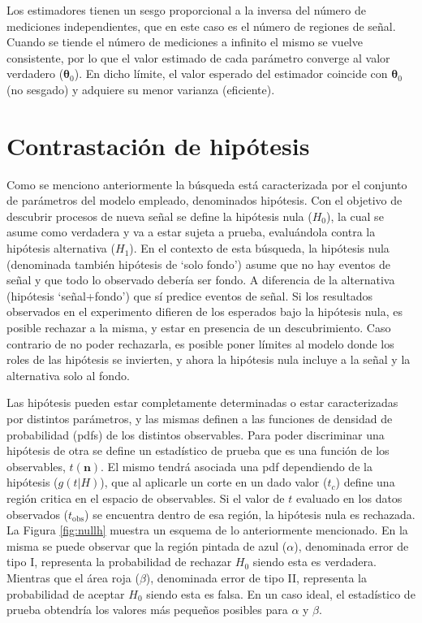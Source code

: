 Los estimadores tienen un sesgo proporcional a la inversa del número de mediciones independientes, que en este caso es el número de regiones de señal. Cuando se tiende el número de mediciones a infinito el mismo se vuelve consistente, por lo que el valor estimado de cada parámetro converge al valor verdadero ($\bm{\theta}_0$). En dicho límite, el valor esperado del estimador coincide con $\bm{\theta}_0$ (no sesgado) y adquiere su menor varianza (eficiente).



\section{Contrastación de hipótesis}

Como se menciono anteriormente la búsqueda está caracterizada por el conjunto de parámetros del modelo empleado, denominados hipótesis. Con el objetivo de descubrir procesos de nueva señal se define la hipótesis nula ($H_0$), la cual se asume como verdadera y va a estar sujeta a prueba, evaluándola contra la hipótesis alternativa ($H_1$). En el contexto de esta búsqueda, la hipótesis nula (denominada también hipótesis de `solo fondo') asume que no hay eventos de señal y que todo lo observado debería ser fondo. A diferencia de la alternativa (hipótesis `señal+fondo') que sí predice eventos de señal. Si los resultados observados en el experimento difieren de los esperados bajo la hipótesis nula, es posible rechazar a la misma, y estar en presencia de un descubrimiento. Caso contrario de no poder rechazarla, es posible poner límites al modelo donde los roles de las hipótesis se invierten, y ahora la hipótesis nula incluye a la señal y la alternativa solo al fondo.

Las hipótesis pueden estar completamente determinadas o estar caracterizadas por distintos parámetros, y las mismas definen a las funciones de densidad de probabilidad (pdfs) de los distintos observables. Para poder discriminar una hipótesis de otra se define un estadístico de prueba que es una función de los observables, $t(\textbf{n})$. El mismo tendrá asociada una pdf dependiendo de la hipótesis ($g(t|H)$), que al aplicarle un corte en un dado valor ($t_c$) define una región critica en el espacio de observables. Si el valor de $t$ evaluado en los datos observados ($t_{\text{obs}}$) se encuentra dentro de esa región, la hipótesis nula es rechazada. La Figura \ref{fig:nullh} muestra un esquema de lo anteriormente mencionado. En la misma se puede observar que la región pintada de azul ($\alpha$), denominada error de tipo I, representa la probabilidad de rechazar $H_0$ siendo esta es verdadera. Mientras que el área roja ($\beta$), denominada error de tipo II, representa la probabilidad de aceptar $H_0$ 
siendo esta es falsa. En un caso ideal, el estadístico de prueba obtendría los valores más pequeños posibles para $\alpha$ y $\beta$.

